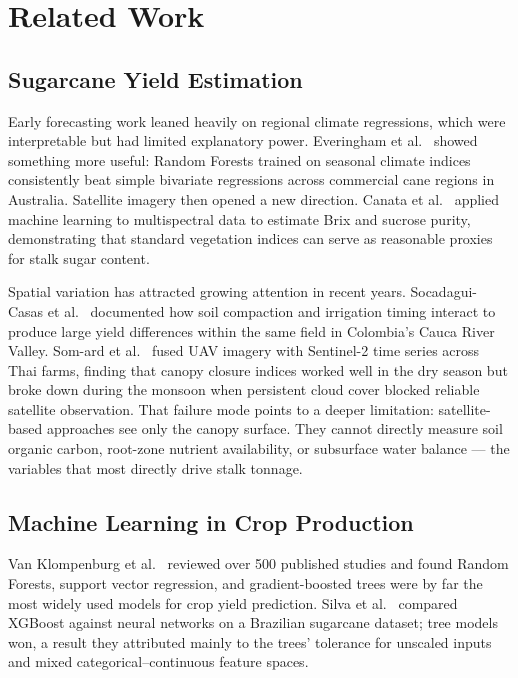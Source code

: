 \documentclass[conference,10pt,letterpaper]{IEEEtran}
\begin{document}
\section{Related Work}

\subsection{Sugarcane Yield Estimation}
Early forecasting work leaned heavily on regional climate regressions, which were interpretable but had limited explanatory power. Everingham et al.~\cite{everingham2016accurate} showed something more useful: Random Forests trained on seasonal climate indices consistently beat simple bivariate regressions across commercial cane regions in Australia. Satellite imagery then opened a new direction. Canata et al.~\cite{canata2024ai} applied machine learning to multispectral data to estimate Brix and sucrose purity, demonstrating that standard vegetation indices can serve as reasonable proxies for stalk sugar content.

Spatial variation has attracted growing attention in recent years. Socadagui-Casas et al.~\cite{socadagui2026spatial} documented how soil compaction and irrigation timing interact to produce large yield differences within the same field in Colombia's Cauca River Valley. Som-ard et al.~\cite{somard2024sugarcane} fused UAV imagery with Sentinel-2 time series across Thai farms, finding that canopy closure indices worked well in the dry season but broke down during the monsoon when persistent cloud cover blocked reliable satellite observation. That failure mode points to a deeper limitation: satellite-based approaches see only the canopy surface. They cannot directly measure soil organic carbon, root-zone nutrient availability, or subsurface water balance --- the variables that most directly drive stalk tonnage.

\subsection{Machine Learning in Crop Production}
Van Klompenburg et al.~\cite{van2020crop} reviewed over 500 published studies and found Random Forests, support vector regression, and gradient-boosted trees were by far the most widely used models for crop yield prediction. Silva et al.~\cite{silva2020sugarcane} compared XGBoost against neural networks on a Brazilian sugarcane dataset; tree models won, a result they attributed mainly to the trees' tolerance for unscaled inputs and mixed categorical--continuous feature spaces.
\end{document}
